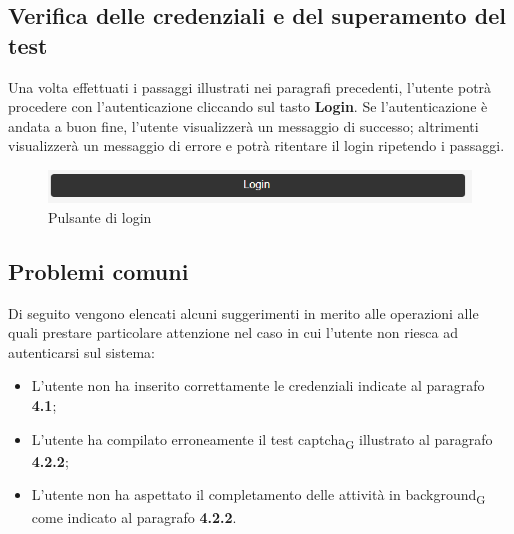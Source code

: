 \subsection{Verifica delle credenziali e del superamento del test}
Una volta effettuati i passaggi illustrati nei paragrafi precedenti, l'utente potrà procedere con l'autenticazione cliccando sul tasto \textbf{Login}. Se l'autenticazione è andata a buon fine, l'utente visualizzerà un messaggio di successo; altrimenti visualizzerà un messaggio di errore e potrà ritentare il login ripetendo i passaggi.

\begin{figure}[H]
    \centering
    \includegraphics[scale=0.8]{img/tastologin.png}
    \caption{Pulsante di login}
\end{figure}   

\subsection{Problemi comuni}
Di seguito vengono elencati alcuni suggerimenti in merito alle operazioni alle quali prestare particolare attenzione nel caso in cui l'utente non riesca ad autenticarsi sul sistema:
\begin{itemize}
	\item L'utente non ha inserito correttamente le credenziali indicate al paragrafo \textbf{4.1};
    \item L'utente ha compilato erroneamente il test captcha\textsubscript{G} illustrato al paragrafo \textbf{4.2.2};
    \item L'utente non ha aspettato il completamento delle attività in background\textsubscript{G} come indicato al paragrafo \textbf{4.2.2}.
\end{itemize} 
